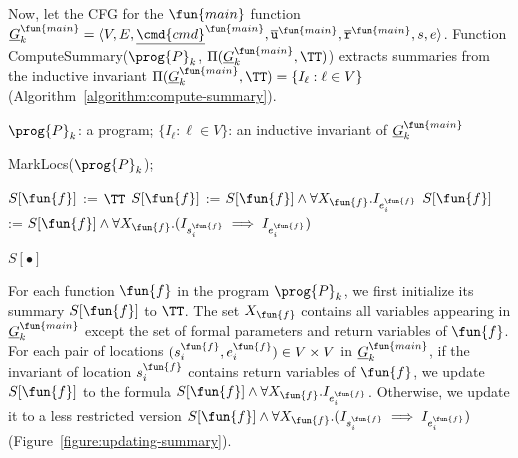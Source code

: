 Now, let the CFG for the $\fun{main}$ function $\underline{G}^{\fun{main}}_k =
\langle V, E, \underline{\cmd{cmd}}^{\fun{main}},
\overline{\mathtt{u}}^{\fun{main}}, \overline{\mathtt{r}}^{\fun{main}},s,e
\rangle$.
Function ComputeSummary($\prog{P}_k$, $\Pi (\underline{G}^{\fun{main}}_k, \TT)$)
extracts summaries from the inductive invariant
$\Pi (\underline{G}^{\fun{main}}_k, \TT)= \{ I_\ell : \ell \in V\}$
(Algorithm~\ref{algorithm:compute-summary}).

\begin{algorithm}
\begin{doublespace}
  \KwIn
  {
    $\prog{P}_k$: a program;
    $\{ I_\ell : \ell \in V \}$: an inductive invariant of $\underline{G}^{\fun{main}}_k$
  }

  MarkLocs($\prog{P}_k$);

  { 
    $S[\fun{f}]$ := $\TT$\;
    {
      {
        $S[\fun{f}]$ := $S[\fun{f}]\wedge \forall X_\fun{f}. I_{e_i^\fun{f}}$
      }
      \Else
      {
        $S[\fun{f}]$ := $S[\fun{f}]\wedge \forall X_\fun{f}. (I_{s_i^\fun{f}} \implies I_{e_i^\fun{f}})$
      }
    }
    
  }

  \Return $S[\bullet]$\;
\end{doublespace}
  \caption{
  $\textmd{ComputeSummary}(\prog{P}_k, \Pi (\underline{G}^{\fun{main}}_k, \TT))$}
  \label{algorithm:compute-summary}
\end{algorithm}

For each function $\fun{f}$ in the program $\prog{P}_k$,
we first initialize its summary $S[\fun{f}]$ to $\TT$.
The set $X_\fun{f}$ contains all variables appearing in
$\underline{G}^{\fun{main}}_k$ except the set of formal parameters and return
variables of $\fun{f}$.
For each pair of locations $(s_i^\fun{f},e_i^\fun{f})\in V\times V$ in $\underline{G}^{\fun{main}}_k$,
if the invariant of location $s_i^\fun{f}$ contains return variables of $\fun{f}$,
we update $S[\fun{f}]$ to the formula $S[\fun{f}]\wedge \forall X_\fun{f}.I_{e_i^\fun{f}}$.
Otherwise, we update it to a less restricted version $S[\fun{f}]\wedge \forall X_\fun{f}. (I_{s_i^\fun{f}} \implies I_{e_i^\fun{f}})$ (Figure~\ref{figure:updating-summary}).

